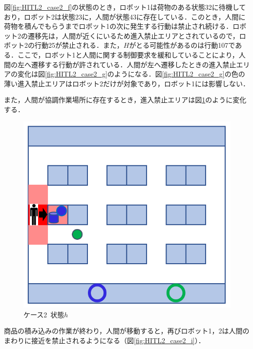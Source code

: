 図\ref{fig:HITL2_case2_f}の状態のとき，ロボット1は荷物のある状態32に待機しており，ロボット2は状態23に，人間が状態43に存在している．このとき，人間に荷物を積んでもらうまでロボット1の次に発生する行動は禁止され続ける．ロボット2の遷移先は，人間が近くにいるため進入禁止エリアとされているので，ロボット2の行動25が禁止される．また，$H$がとる可能性があるのは行動107である．ここで，ロボット1と人間に関する制御要求を緩和していることにより，人間の左へ遷移する行動が許されている．人間が左へ遷移したときの進入禁止エリアの変化は図\ref{fig:HITL2_case2_g}のようになる．図\ref{fig:HITL2_case2_g}の色の薄い進入禁止エリアはロボット2だけが対象であり，ロボット1には影響しない．

また，人間が協調作業場所に存在するとき，進入禁止エリアは図\ref{fig:HITL2_case2_h}のように変化する．

\begin{figure}[!t]
    \centering
    \includegraphics[scale=0.3]{figures/HITL2_case2_h.png}
    \caption{ケース2\ 状態$h$}
    \label{fig:HITL2_case2_h}
\end{figure}

商品の積み込みの作業が終わり，人間が移動すると，再びロボット1，2は人間のまわりに接近を禁止されるようになる（図\ref{fig:HITL2_case2_i}）．

